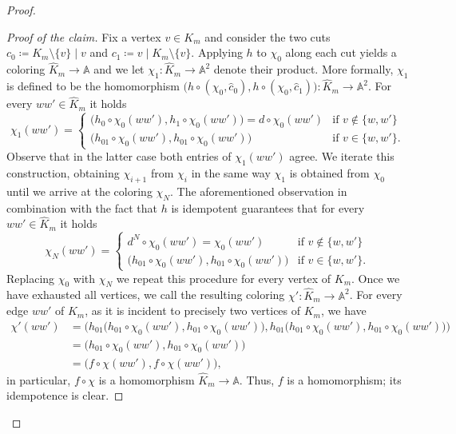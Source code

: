 \documentclass[10pt,a4paper]{amsart}
\newcommand{\str}[1]{\mathbb{#1}}
\begin{document}
\begin{proof}
\begin{proof}[Proof of the claim]
Fix a vertex $v\in K_m$ and consider the two cuts $c_{0} \coloneq K_m\setminus\{v\}\mid v$ and
$c_1\coloneq  v\mid K_m\setminus\{v\}$.
Applying $h$ to $\chi_0$ along each cut yields a coloring $\hat K_m \to \str A$ and we let $\chi_1\colon \hat K_m \to \str A^2$ denote their product. More formally, $\chi_1$ is defined to be the homomorphism $\big( h \circ (\chi_0,\hat c_0), h \circ (\chi_0,\hat c_1) \big)\colon \hat K_m \to \str A^2$.
For every $w w' \in \hat K_m$ it holds
    \begin{equation*}
            \chi_1(w w') =
    \begin{cases}
    \big(h_0\circ\chi_0(w w'), h_1\circ \chi_0(w w') \big) = d\circ \chi_0(w w') &\text{if } v\notin \{w, w'\} \\ 
    \big(h_{01}\circ\chi_0(w w'), h_{01}\circ\chi_0(w w')\big) &\text{if } v\in \{w, w'\}.
    \end{cases}
    \end{equation*}
    Observe that in the latter case both entries of $\chi_1(w w')$ agree. We iterate this construction, obtaining $\chi_{i+1}$ from $\chi_i$ in the same way $\chi_1$ is obtained from $\chi_0$ until we arrive at the coloring $\chi_N$. The aforementioned observation in combination with the fact that $h$ is idempotent guarantees that for every $w w' \in \hat K_m$ it holds 
    \begin{equation*}
            \chi_N(w w') =
    \begin{cases}
    d^N \circ \chi_0(w w') = \chi_0(w w')&\text{if } v\notin \{w, w'\}\\ 
    \big(h_{01}\circ\chi_0(w w'),h_{01}\circ\chi_0(w w')\big) &\text{if } v\in \{w, w'\}.
    \end{cases} 
    \end{equation*}
    Replacing $\chi_0$ with $\chi_N$ we repeat this procedure for every vertex of 
    $K_m$.
    Once we have exhausted all vertices, we call the resulting coloring $\chi'\colon \hat K_m \to \str A^2$. For every edge $w w'$ of $K_m$, as it is incident to precisely two vertices of $K_m$, we have
    \begin{align*}
        \chi'(w w') &= \Big( h_{01}\big(h_{01}\circ \chi_0(w w'), h_{01}\circ \chi_0(w w')\big), h_{01}\big(h_{01}\circ \chi_0(w w'), h_{01}\circ \chi_0(w w')\big) \Big)\\
        &= \big( h_{01}\circ \chi_0(w w'), h_{01}\circ \chi_0(w w') \big)\\
        &= \big( f \circ \chi(w w'), f \circ \chi(w w') \big),
    \end{align*}
    in particular, $f \circ \chi$ is a homomorphism $\hat K_m \to \str A$.
    Thus, $f$ is a homomorphism; its idempotence is clear.
\end{proof}


\end{proof}
\end{document}
